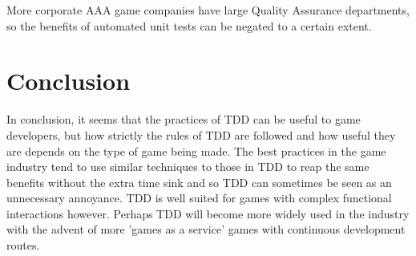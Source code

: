 \documentclass{scrartcl}
\begin{document}
More corporate AAA game companies have large Quality Assurance departments, so the benefits of automated unit tests can be negated to a certain extent. 



\section{Conclusion}

In conclusion, it seems that the practices of TDD can be useful to game developers, but how strictly the rules of TDD are followed and how useful they are depends on the type of game being made. The best practices in the game industry tend to use similar techniques to those in TDD to reap the same benefits \cite{fucci2017dissection} without the extra time sink and so TDD can sometimes be seen as an unnecessary annoyance. TDD is well suited for games with complex functional interactions however. Perhaps TDD will become more widely used in the industry with the advent of more 'games as a service' games with continuous development routes.




\end{document}
